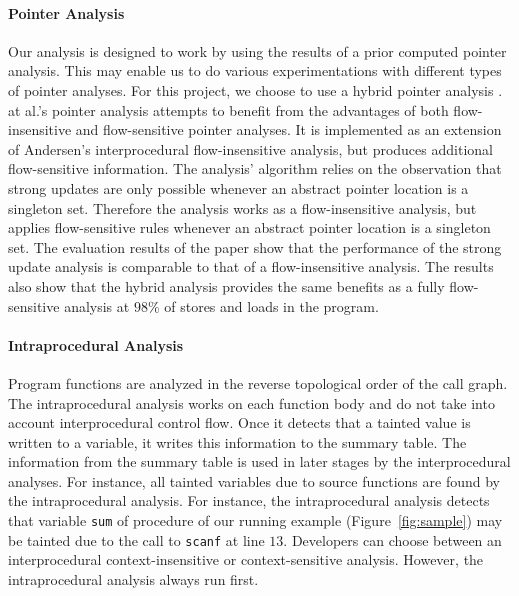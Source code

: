\paragraph{Pointer Analysis}
Our analysis is designed to work by using the results of
a prior computed pointer analysis. This may enable us to
do various experimentations with different types of pointer
analyses. For this project, we choose to use a hybrid
pointer analysis \cite{Lhotak:2011:PAE}. \lothak{} at al.'s
pointer analysis attempts to benefit from the
advantages of both flow-insensitive and flow-sensitive 
pointer analyses. It is implemented as an extension of
Andersen's interprocedural flow-insensitive analysis, but
produces additional flow-sensitive information. The analysis'
algorithm relies on the observation that strong updates
are only possible whenever an abstract pointer location is
a singleton set. Therefore the analysis works as a
flow-insensitive analysis, but applies flow-sensitive
rules whenever an abstract pointer location is a singleton set.
The evaluation results of the paper show that the performance
of the strong update analysis is comparable to that of a
flow-insensitive analysis. The results also show that the hybrid
analysis provides the same benefits as a fully flow-sensitive
analysis at $98\%$ of stores and loads in the program.

\paragraph{Intraprocedural Analysis}
Program functions are analyzed in the reverse topological
order of the call graph.
The intraprocedural analysis works on each function body and
do not take into account interprocedural control flow.
Once it detects that a tainted value is written to a variable,
it writes this information to the summary table. The
information from the summary table is used in later stages
by the interprocedural analyses.
For instance, all tainted variables due to source functions
are found by the intraprocedural analysis.
For instance, the intraprocedural analysis detects that variable
\texttt{sum} of procedure \compute{} of our running example
(Figure~\ref{fig:sample}) may be tainted due to the call
to \texttt{scanf} at line $13$.
Developers can choose between an interprocedural context-insensitive
or context-sensitive analysis. However, the intraprocedural
analysis always run first. 

